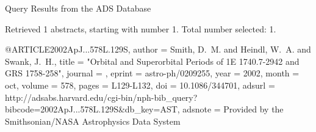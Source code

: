 Query Results from the ADS Database


Retrieved 1 abstracts, starting with number 1.  Total number selected: 1.

@ARTICLE{2002ApJ...578L.129S,
   author = {{Smith}, D.~M. and {Heindl}, W.~A. and {Swank}, J.~H.},
    title = "{Orbital and Superorbital Periods of 1E 1740.7-2942 and GRS 1758-258}",
  journal = {\apjl},
   eprint = {astro-ph/0209255},
     year = 2002,
    month = oct,
   volume = 578,
    pages = {L129-L132},
      doi = {10.1086/344701},
   adsurl = {http://adsabs.harvard.edu/cgi-bin/nph-bib_query?bibcode=2002ApJ...578L.129S&db_key=AST},
  adsnote = {Provided by the Smithsonian/NASA Astrophysics Data System}
}


